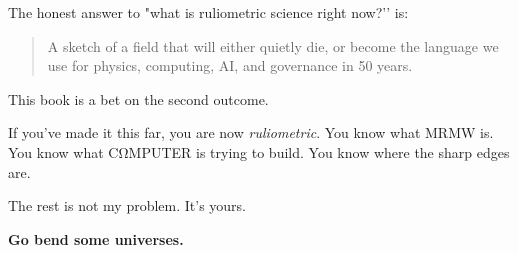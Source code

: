 \medskip

The honest answer to "what is ruliometric science right now?’’ is:

\begin{quote}
A sketch of a field that will either quietly die, or become the language we use for physics, computing, AI, and governance in 50 years.
\end{quote}

This book is a bet on the second outcome.

\medskip

If you’ve made it this far, you are now \emph{ruliometric}. You know what MRMW is.
You know what CΩMPUTER is trying to build. You know where the sharp edges are.

The rest is not my problem. It’s yours.

\begin{center}
\textbf{Go bend some universes.}
\end{center}
